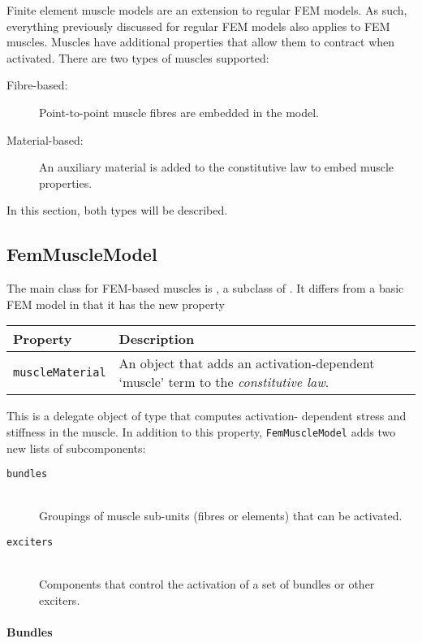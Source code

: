 Finite element muscle models are an extension to regular FEM models.  As such,
everything previously discussed for regular FEM models also applies to FEM
muscles.  Muscles have additional properties that allow them to contract when 
activated.  There are two types of muscles supported:
\begin{description}
\item[Fibre-based:] Point-to-point muscle fibres are embedded in the model.
\item[Material-based:] An auxiliary material is added to the constitutive law
    to embed muscle properties. 
\end{description}
In this section, both types will be described.

\subsection{FemMuscleModel}

The main class for FEM-based muscles is 
, a subclass 
of .  It differs from a basic
FEM model in that it has the new property
\begin{center}
	\begin{tabular}{|ll|}
		\hline
		Property & Description\\
		\hline
		{\tt muscleMaterial} & An object that adds an activation-dependent
		                       `muscle' term to the \emph{constitutive law}.\\
		\hline
	\end{tabular}
\end{center}
This is a delegate object of type 
 that computes activation-%
dependent stress and stiffness in the muscle. In addition to this property, 
{\tt FemMuscleModel} adds two new lists of subcomponents:
\begin{description}
   \item[{\tt bundles}]\mbox{}\\
   Groupings of muscle sub-units (fibres or elements) that can be activated.

   \item[{\tt exciters}]\mbox{}\\
   Components that control the activation of a set of bundles or other exciters.
\end{description}

\paragraph{Bundles}
\ifLaTeXML{\newline}

